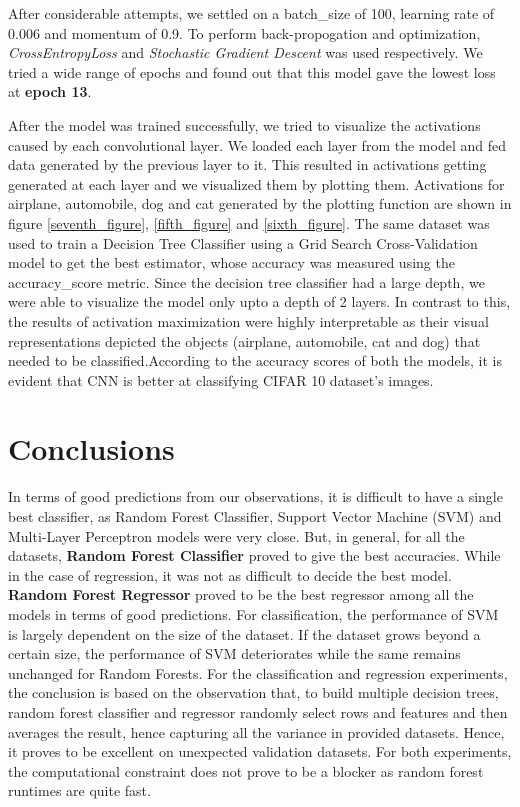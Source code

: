 \documentclass[10pt,twocolumn,letterpaper]{article}
\begin{document}
After considerable attempts, we settled on a batch\_size of 100, learning rate of 0.006 and momentum of 0.9. To perform back-propogation and optimization, \textit{CrossEntropyLoss} and \textit{Stochastic Gradient Descent} was used respectively. We tried a wide range of epochs and found out that this model gave the lowest loss at \textbf{epoch 13}.

After the model was trained successfully, we tried to visualize the activations caused by each convolutional layer. We loaded each layer from the model and fed data generated by the previous layer to it. This resulted in activations getting generated at each layer and we visualized them by plotting them. Activations for airplane, automobile, dog and cat generated by the plotting function are shown in figure \ref{seventh_figure}, \ref{fifth_figure} and \ref{sixth_figure}.
The same dataset was used to train a Decision Tree Classifier using a Grid Search Cross-Validation model to get the best estimator, whose accuracy was measured using the accuracy\_score metric.
Since the decision tree classifier had a large depth, we were able to visualize the model only upto a depth of 2 layers. In contrast to this, the results of activation maximization were highly interpretable as their visual representations depicted the objects (airplane, automobile, cat and dog) that needed to be classified.According to the accuracy scores of both the models, it is evident that CNN is better at classifying CIFAR 10 dataset’s images.





\section{Conclusions}

In terms of good predictions from our observations, it is difficult to have a single best classifier, as Random Forest Classifier, Support Vector Machine (SVM) and Multi-Layer Perceptron models were very close. But, in general, for all the datasets, \textbf{Random Forest Classifier} proved to give the best accuracies. While in the case of regression, it was not as difficult to decide the best model.  \textbf{Random Forest Regressor} proved to be the best regressor among all the models in terms of good predictions.
For classification, the performance of SVM is largely dependent on the size of the dataset. If the dataset grows beyond a certain size, the performance of SVM deteriorates while the same remains unchanged for Random Forests. For the classification and regression experiments, the conclusion is based on the observation that, to build multiple decision trees, random forest classifier and regressor randomly select rows and features and then averages the result, hence capturing all the variance in provided datasets. Hence, it proves to be excellent on unexpected validation datasets.
For both experiments, the computational constraint does not prove to be a blocker as random forest runtimes are quite fast.
\end{document}
